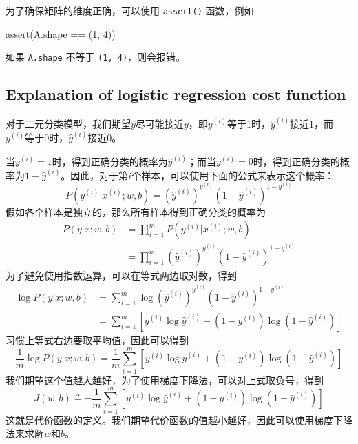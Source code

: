 \vspace{0.5\baselineskip}
为了确保矩阵的维度正确，可以使用 \verb|assert()| 函数，例如
\begin{python}
assert(A.shape == (1, 4))
\end{python}
如果 \verb|A.shape| 不等于 \verb|(1, 4)|，则会报错。

\subsection{Explanation of logistic regression cost function}

对于二元分类模型，我们期望$\hat{y}$尽可能接近$y$，即${y}^{(i)}$等于$1$时，$\hat{y}^{(i)}$接近$1$，而${y}^{(i)}$等于$0$时，$\hat{y}^{(i)}$接近$0$。

当$y^{(i)}=1$时，得到正确分类的概率为$\hat{y}^{(i)}$；而当$y^{(i)}=0$时，得到正确分类的概率为$1-\hat{y}^{(i)}$。因此，对于第$i$个样本，可以使用下面的公式来表示这个概率：
\begin{equation}
	P(y^{(i)} | x^{(i)}; w, b) = (\hat{y}^{(i)})^{y^{(i)}} (1-\hat{y}^{(i)})^{1-y^{(i)}}
\end{equation}
假如各个样本是独立的，那么所有样本得到正确分类的概率为
\begin{equation}
	\begin{aligned}
		P(y | x; w, b) &= \prod_{i=1}^{m} P(y^{(i)} | x^{(i)}; w, b)\\
		&= \prod_{i=1}^{m} (\hat{y}^{(i)})^{y^{(i)}} (1-\hat{y}^{(i)})^{1-y^{(i)}}
	\end{aligned}
\end{equation}
为了避免使用指数运算，可以在等式两边取对数，得到
\begin{equation}
	\begin{aligned}
		\log P(y | x; w, b) &= \sum_{i=1}^{m} \log (\hat{y}^{(i)})^{y^{(i)}} (1-\hat{y}^{(i)})^{1-y^{(i)}}\\
		&= \sum_{i=1}^{m} \left[ y^{(i)} \log \hat{y}^{(i)} + (1-y^{(i)}) \log (1-\hat{y}^{(i)}) \right]
	\end{aligned}
\end{equation}
习惯上等式右边要取平均值，因此可以得到
\begin{equation}
	\frac{1}{m} \log P(y | x; w, b) = \frac{1}{m} \sum_{i=1}^{m} \left[ y^{(i)} \log \hat{y}^{(i)} + (1-y^{(i)}) \log (1-\hat{y}^{(i)}) \right]
\end{equation}
我们期望这个值越大越好，为了使用梯度下降法，可以对上式取负号，得到
\begin{equation}
	J(w, b) \triangleq - \frac{1}{m} \sum_{i=1}^{m} \left[ y^{(i)} \log \hat{y}^{(i)} + (1-y^{(i)}) \log (1-\hat{y}^{(i)}) \right]
\end{equation}
这就是代价函数的定义。我们期望代价函数的值越小越好，因此可以使用梯度下降法来求解$w$和$b$。

